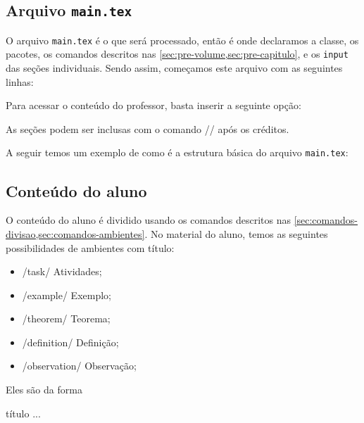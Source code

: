 \subsection{Arquivo \texttt{main.tex}}\label{sec:main-tex}

O arquivo \verb|main.tex| é o que será processado, então é onde
declaramos a classe, os pacotes, os comandos descritos nas
\cref{sec:pre-volume,sec:pre-capitulo}, e os \verb|input| das seções
individuais. Sendo assim, começamos este arquivo com as seguintes
linhas:


Para acessar o conteúdo do professor, basta inserir a seguinte opção:


As seções podem ser inclusas com o comando
\latexinline// após os créditos.

A seguir temos um exemplo de como é a estrutura básica do arquivo
\verb|main.tex|:



\subsection{Conteúdo do aluno}\label{sec:conteudo-aluno}

O conteúdo do aluno é dividido usando os comandos descritos nas
\cref{sec:comandos-divisao,sec:comandos-ambientes}. No material do
aluno, temos as seguintes possibilidades de ambientes com título:

\begin{itemize}
	\item \latexinline/task/ Atividades;
	\item \latexinline/example/ Exemplo;
	\item \latexinline/theorem/ Teorema;
	\item \latexinline/definition/ Definição;
	\item \latexinline/observation/ Observação;
\end{itemize}

Eles são da forma

\begin{latexcode}
\begin{task}{título}
  ...
\end{task}
\end{latexcode}

